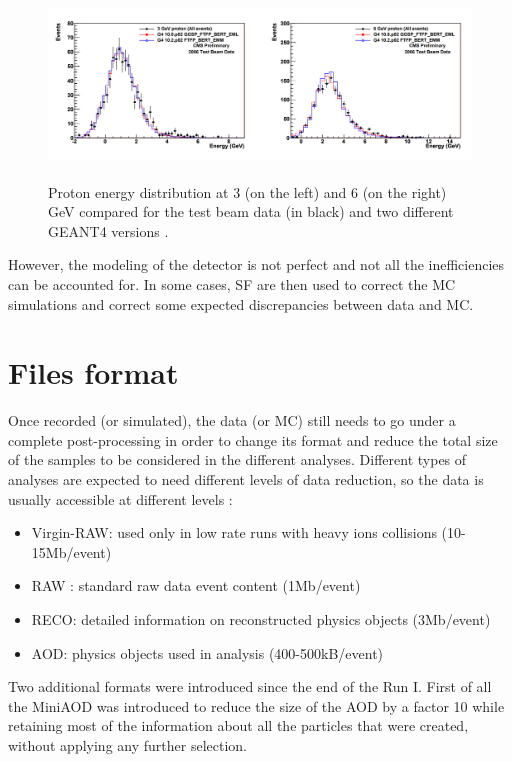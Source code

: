 \documentclass[a4paper, 10pt, openright]{report}
\begin{document}
\begin{figure}[htbp]
\begin{center}
\includegraphics[width=14cm, height=5cm]{figs/CMSGEANT.png}
\caption{Proton energy distribution at 3 (on the left) and 6 (on the right) GeV compared for the test beam data (in black) and two different GEANT4 versions \cite{GEANTComp}.}
\label{fig:CMSGEANT}
\end{center}
\end{figure}

However, the modeling of the detector is not perfect and not all the inefficiencies can be accounted for. In some cases, \ac{SF} are then used to correct the \ac{MC} simulations and correct some expected discrepancies between data and \ac{MC}.

\section{Files format} \label{section:Files}

Once recorded (or simulated), the data (or \ac{MC}) still needs to go under a complete post-processing in order to change its format and reduce the total size of the samples to be considered in the different analyses. Different types of analyses are expected to need different levels of data reduction, so the data is usually accessible at different levels \cite{nanoAOD}:

\begin{itemize}
\item Virgin-RAW: used only in low rate runs with heavy ions collisions (10-15Mb/event)
\item RAW : standard raw data event content (1Mb/event)
\item RECO: detailed information on reconstructed physics objects (3Mb/event)
\item \ac{AOD}: physics objects used in analysis (400-500kB/event)
\end{itemize}

Two additional formats were introduced since the end of the Run I. First of all the MiniAOD was introduced to reduce the size of the \ac{AOD} by a factor 10 while retaining most of the information about all the particles that were created, without applying any further selection.
\end{document}
